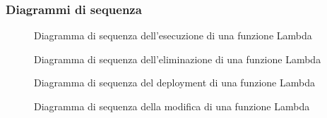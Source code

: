 \subsubsection{Diagrammi di sequenza}
\begin{figure}[!h]
	\noindent
	\caption{Diagramma di sequenza dell'esecuzione di una funzione Lambda}
\end{figure}
\begin{figure}[!h]
	\noindent
	\caption{Diagramma di sequenza dell'eliminazione di una funzione Lambda}
\end{figure}
\begin{figure}[!h]
	\noindent
	\caption{Diagramma di sequenza del deployment di una funzione Lambda}
\end{figure}
\begin{figure}[!h]
	\noindent
	\caption{Diagramma di sequenza della modifica di una funzione Lambda}
\end{figure}
